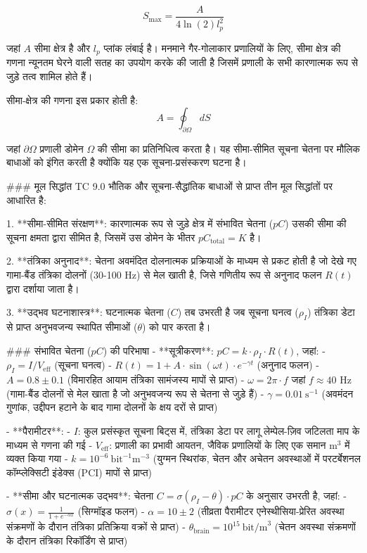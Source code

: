 $$S_{\text{max}} = \frac{A}{4\ln(2)l_p^2}$$

जहां $A$ सीमा क्षेत्र है और $l_p$ प्लांक लंबाई है। मनमाने गैर-गोलाकार प्रणालियों के लिए, सीमा क्षेत्र की गणना न्यूनतम घेरने वाली सतह का उपयोग करके की जाती है जिसमें प्रणाली के सभी कारणात्मक रूप से जुड़े तत्व शामिल होते हैं।

सीमा-क्षेत्र की गणना इस प्रकार होती है:
$$A = \oint_{\partial \Omega} dS$$

जहां $\partial \Omega$ प्रणाली डोमेन $\Omega$ की सीमा का प्रतिनिधित्व करता है। यह सीमा-सीमित सूचना चेतना पर मौलिक बाधाओं को इंगित करती है क्योंकि यह एक सूचना-प्रसंस्करण घटना है।

### मूल सिद्धांत
TC 9.0 भौतिक और सूचना-सैद्धांतिक बाधाओं से प्राप्त तीन मूल सिद्धांतों पर आधारित है:

1. **सीमा-सीमित संरक्षण**: कारणात्मक रूप से जुड़े क्षेत्र में संभावित चेतना ($pC$) उसकी सीमा की सूचना क्षमता द्वारा सीमित है, जिसमें उस डोमेन के भीतर $pC_{\text{total}} = K$ है।
    
2. **तंत्रिका अनुनाद**: चेतना अवमंदित दोलनात्मक प्रक्रियाओं के माध्यम से प्रकट होती है जो देखे गए गामा-बैंड तंत्रिका दोलनों (30-100 Hz) से मेल खाती है, जिसे गणितीय रूप से अनुनाद फलन $R(t)$ द्वारा दर्शाया जाता है।
    
3. **उद्भव घटनाशास्त्र**: घटनात्मक चेतना ($C$) तब उभरती है जब सूचना घनत्व ($\rho_I$) तंत्रिका डेटा से प्राप्त अनुभवजन्य स्थापित सीमाओं ($\theta$) को पार करता है।

### संभावित चेतना ($pC$) की परिभाषा
- **सूत्रीकरण**: $pC = k \cdot \rho_I \cdot R(t)$, जहां:
  - $\rho_I = I / V_{\text{eff}}$ (सूचना घनत्व)
  - $R(t) = 1 + A \cdot \sin(\omega t) \cdot e^{-\gamma t}$ (अनुनाद फलन)
  - $A = 0.8 \pm 0.1$ (विमारहित आयाम तंत्रिका सामंजस्य मापों से प्राप्त)
  - $\omega = 2\pi \cdot f$ जहां $f \approx 40$ Hz (गामा-बैंड दोलनों से मेल खाता है जो अनुभवजन्य रूप से चेतना से जुड़े हैं)
  - $\gamma = 0.01~\text{s}^{-1}$ (अवमंदन गुणांक, उद्दीपन हटाने के बाद गामा दोलनों के क्षय दरों से प्राप्त)

- **पैरामीटर**: 
  - $I$: कुल प्रसंस्कृत सूचना बिट्स में, तंत्रिका डेटा पर लागू लेम्पेल-ज़िव जटिलता माप के माध्यम से गणना की गई
  - $V_{\text{eff}}$: प्रणाली का प्रभावी आयतन, जैविक प्रणालियों के लिए एक समान $\text{m}^3$ में व्यक्त किया गया
  - $k = 10^{-6}~\text{bit}^{-1}\text{m}^{-3}$ (युग्मन स्थिरांक, चेतन और अचेतन अवस्थाओं में परटर्बेशनल कॉम्प्लेक्सिटी इंडेक्स (PCI) मापों से प्राप्त)

- **सीमा और घटनात्मक उद्भव**: चेतना $C = \sigma(\rho_I - \theta) \cdot pC$ के अनुसार उभरती है, जहां:
  - $\sigma(x) = \frac{1}{1 + e^{-\alpha x}}$ (सिग्मॉइड फलन)
  - $\alpha = 10 \pm 2$ (तीव्रता पैरामीटर एनेस्थीसिया-प्रेरित अवस्था संक्रमणों के दौरान तंत्रिका प्रतिक्रिया वक्रों से प्राप्त)
  - $\theta_{\text{brain}} = 10^{15}~\text{bit/m}^3$ (चेतन अवस्था संक्रमणों के दौरान तंत्रिका रिकॉर्डिंग से प्राप्त)

